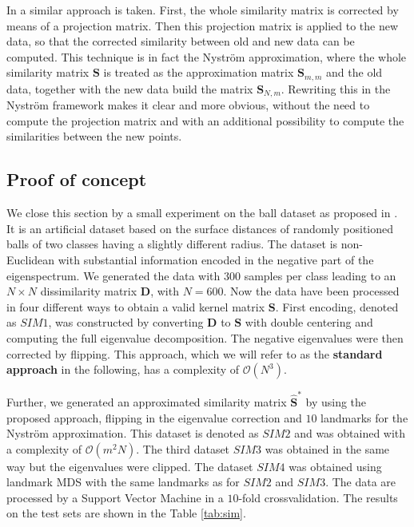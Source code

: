 \documentclass[twoside,11pt]{article}
\begin{document}
In \cite{DBLP:journals/jmlr/ChenGGRC09} a similar approach is taken.
First, the whole similarity matrix
is corrected by means of a projection matrix. Then this projection matrix is
applied to the new data, so that the corrected similarity between old and new
data can be computed. This technique is in fact the Nystr\"om approximation,
where the whole similarity matrix $\mathbf{S}$ is treated as the approximation
matrix $\mathbf{S}_{m,m}$ and the old data, together with the new data build the
matrix $\mathbf{S}_{N,m}$. Rewriting this in the Nystr\"om framework
makes it clear and more obvious, without the need to compute the projection matrix and
with an additional possibility to compute the similarities between the new points.


\subsection{Proof of concept}
We close this section by a small experiment on the ball dataset as proposed in \cite{DBLP:conf/sspr/DuinP10}. 
It is an artificial dataset based on the surface distances of randomly positioned balls of two classes having a slightly different radius.
The dataset is non-Euclidean with substantial information encoded in the negative part of the eigenspectrum. 
We generated the data with $300$ samples per class leading to an $N \times N$
dissimilarity matrix $\mathbf{D}$, with $N=600$.
Now the data have been processed in four different ways
to obtain a valid kernel matrix $\mathbf{S}$.
First encoding, denoted as $SIM1$, was constructed
by converting $\mathbf{D}$ to $\mathbf{S}$
with double centering and computing the full eigenvalue decomposition.
The negative eigenvalues were then corrected by flipping.
This approach, which we will refer to as the {\bf standard approach} in the following,
has a complexity of $\mathcal{O}(N^3)$. 

Further, we generated an approximated similarity matrix $\mathbf{\hat{S}}^*$ by using the proposed approach, flipping in the eigenvalue correction
and $10$ landmarks for the Nystr\"om approximation. This dataset is denoted as $SIM2$ and was obtained with a complexity of $\mathcal{O}(m^2N)$.
The third dataset $SIM3$ was obtained in the same way but the eigenvalues were clipped. The dataset $SIM4$ was obtained using
landmark MDS with the same landmarks as for $SIM2$ and $SIM3$.
The data are processed by a Support Vector Machine in a $10$-fold
crossvalidation. The results on the test sets are shown in the Table \ref{tab:sim}. 
\end{document}
